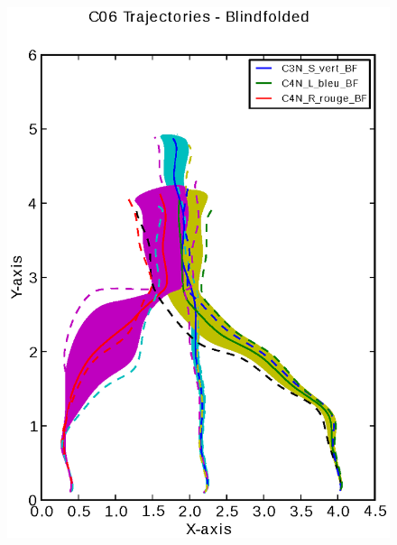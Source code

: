 \documentclass[a4page,landscape,twocolumn,10pt]{article}
\begin{document}
\begin{figure}[!htbp]
  \includegraphics[width=0.4\linewidth]{C06_trajectory_BF.eps}
\end{figure}

\newpage
\end{document}
